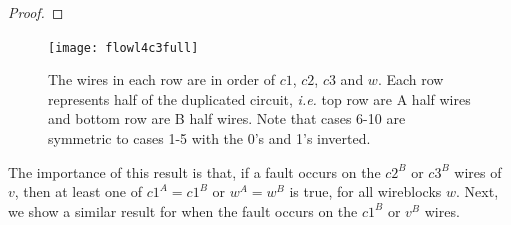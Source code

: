 \documentclass[12pt]{report}
\begin{document}
\begin{proof}

\end{proof}

\begin{figure}
\centering
\texttt{[image: flowl4c3full]}
\caption[Wireblock transitions with fault on $c1^B$ or $w^B$]{The wires in each row are in order of $c1$, $c2$, $c3$ and $w$. Each row represents half of the duplicated circuit, {\em i.e.} top row are A half wires and bottom row are B half wires. Note that cases 6-10 are symmetric to cases 1-5 with the 0's and 1's inverted.}
\label{fig:l4}
\end{figure}

The importance of this result is that, if a fault occurs on the $c2^B$ or $c3^B$ wires of $v$, then at least one of $c1^A=c1^B$ or $w^A=w^B$ is true, for all wireblocks $w$.  Next, we show a similar result for when the fault occurs on the $c1^B$ or $v^B$ wires. 

\end{document}
